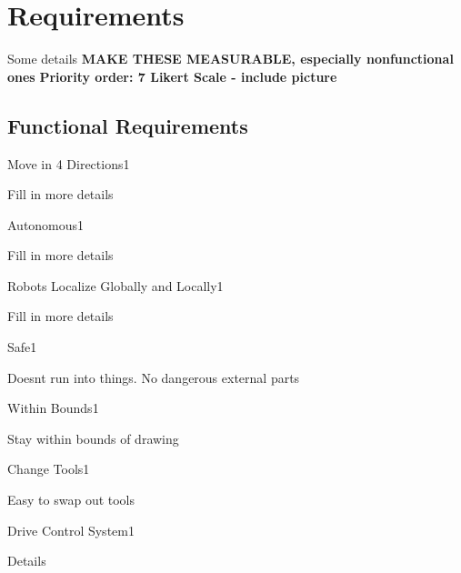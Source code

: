 
\section{Requirements}
\label{sec:requirements}
Some details
\textbf{MAKE THESE MEASURABLE, especially nonfunctional ones}
\textbf{Priority order: 7 Likert Scale - include picture}

\subsection{Functional Requirements}

\begin{functional_requirement}{Move in 4 Directions}{1}
\item Fill in more details 
\end{functional_requirement}

\begin{functional_requirement}{Autonomous}{1}
\item Fill in more details 
\end{functional_requirement}

\begin{functional_requirement}{Robots Localize Globally and Locally}{1}
\item Fill in more details 
\end{functional_requirement}

\begin{functional_requirement}{Safe}{1}
\item Doesnt run into things. No dangerous external parts
\end{functional_requirement}

\begin{functional_requirement}{Within Bounds}{1}
\item Stay within bounds of drawing
\end{functional_requirement}

\begin{functional_requirement}{Change Tools}{1}
\item Easy to swap out tools
\end{functional_requirement}

\begin{functional_requirement}{Drive Control System}{1}
\item Details
\end{functional_requirement}

